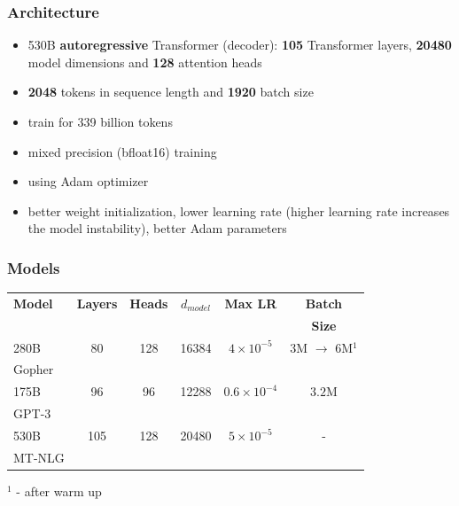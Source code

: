 \documentclass{beamer}
\begin{document}
\begin{frame}
    \frametitle{Architecture}
    \begin{itemize}
        \item 530B \textbf{autoregressive} Transformer (decoder): \textbf{105} Transformer layers, \textbf{20480} model dimensions and \textbf{128} attention heads
        \item \textbf{2048} tokens in sequence length and \textbf{1920} batch size
        \item train for 339 billion tokens
        \item mixed precision (bfloat16) training
        \item using Adam optimizer
        \item better weight initialization, lower learning rate (higher learning rate increases the model instability), better Adam parameters
    \end{itemize}
\end{frame}

\begin{frame}
    \frametitle{Models}
    \begin{center}
        \begin{tabular}{ l | c | c | c | c | c }
        \textbf{Model} & \textbf{Layers} & \textbf{Heads} & \textbf{$d_{model}$} & \textbf{Max LR} & \textbf{Batch} \\
        & & & & & \textbf{Size} \\
        \hline
        280B & 80 & 128 & 16384 & $4 \times 10^{-5}$ & $3$M $\rightarrow$ $6$M$^{1}$ \\
        Gopher & & & & & \\
        \hline
        175B & 96 & 96  & 12288 & $0.6 \times 10^{-4}$ & $3.2$M \\
        GPT-3 & & & & & \\
        \hline
        530B & 105 & 128  & 20480 & $5 \times 10^{-5}$ & - \\
        MT-NLG & & & & & \\
        \end{tabular}
    \end{center}

    \tiny{$^{1}$ - after warm up}
\end{frame}
\end{document}
